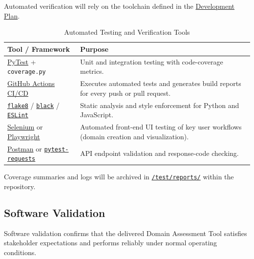 \documentclass[12pt, titlepage]{article}
\renewcommand{\arraystretch}{1.15}
\begin{document}
Automated verification will rely on the toolchain defined in the \href{https://github.com/thaafei/DomainX/blob/main/docs/DevelopmentPlan/DevelopmentPlan.pdf}{Development
Plan}.

\begin{table}[H]
\centering
\caption{Automated Testing and Verification Tools}
\setlength{\tabcolsep}{6pt}
\renewcommand{\arraystretch}{1.2}
\footnotesize

\begin{tabularx}{\textwidth}{l X}
\toprule
\textbf{Tool / Framework} & \textbf{Purpose} \\
\midrule
\arrayrulecolor[gray]{0.8}
\href{https://docs.pytest.org/en/stable/}{PyTest} + \texttt{coverage.py} &
Unit and integration testing with code-coverage metrics. \\
\hline
\href{https://github.com/thaafei/DomainX/actions}{GitHub Actions CI/CD} &
Executes automated tests and generates build reports for every push or pull
request. \\
\hline
\texttt{\href{https://flake8.pycqa.org/en/latest/}{flake8}} / \texttt{\href{https://github.com/psf/black}{black}} / \texttt{\href{https://eslint.org/}{ESLint}} &
Static analysis and style enforcement for Python and JavaScript. \\
\hline
\href{https://www.selenium.dev/}{Selenium} or \href{https://playwright.dev/}{Playwright} &
Automated front-end UI testing of key user workflows (domain creation and visualization). \\
\hline
\href{https://www.postman.com/}{Postman} or \texttt{\href{https://requests-mock.readthedocs.io/en/latest/pytest.html}{pytest-requests}} &
API endpoint validation and response-code checking. \\
\bottomrule
\end{tabularx}
\end{table}

Coverage summaries and logs will be archived in \texttt{\href{https://github.com/thaafei/DomainX/tree/main/test}{/test/reports/}} within
the repository.

\subsection{Software Validation}
\label{subsec:software-validation}

Software validation confirms that the delivered Domain Assessment Tool satisfies
stakeholder expectations and performs reliably under normal operating
conditions.
\end{document}
